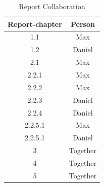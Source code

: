 \documentclass[12pt, a4paper]{article}
\begin{document}
\begin{table}[h]
\centering
    \begin{tabular}{|c|c|}
        \hline
        Report-chapter & Person \\        
        \hline
        1.1 & Max \\
        1.2 & Daniel \\
        2.1 & Max \\
        2.2.1 & Max \\
        2.2.2 & Max \\
        2.2.3 & Daniel \\
        2.2.4 & Daniel \\
        2.2.5.1 & Max \\
        2.2.5.1 & Daniel \\
        3 & Together \\
        4 & Together \\
        5 & Together \\
        \hline
    \end{tabular}
    \caption{Report Collaboration}
\end{table}

\pagebreak
\nocite{*}


\end{document}
